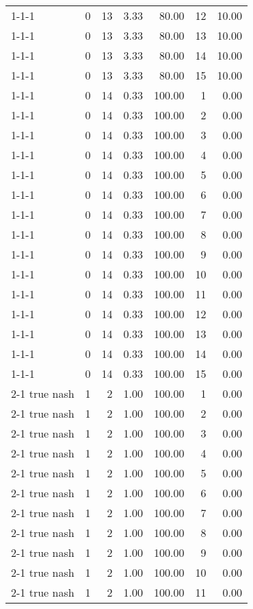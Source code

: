 \begin{tabular}{lrrrrrr}
1-1-1 & 0 & 13 & 3.33 & 80.00 & 12 & 10.00 \\
1-1-1 & 0 & 13 & 3.33 & 80.00 & 13 & 10.00 \\
1-1-1 & 0 & 13 & 3.33 & 80.00 & 14 & 10.00 \\
1-1-1 & 0 & 13 & 3.33 & 80.00 & 15 & 10.00 \\
1-1-1 & 0 & 14 & 0.33 & 100.00 & 1 & 0.00 \\
1-1-1 & 0 & 14 & 0.33 & 100.00 & 2 & 0.00 \\
1-1-1 & 0 & 14 & 0.33 & 100.00 & 3 & 0.00 \\
1-1-1 & 0 & 14 & 0.33 & 100.00 & 4 & 0.00 \\
1-1-1 & 0 & 14 & 0.33 & 100.00 & 5 & 0.00 \\
1-1-1 & 0 & 14 & 0.33 & 100.00 & 6 & 0.00 \\
1-1-1 & 0 & 14 & 0.33 & 100.00 & 7 & 0.00 \\
1-1-1 & 0 & 14 & 0.33 & 100.00 & 8 & 0.00 \\
1-1-1 & 0 & 14 & 0.33 & 100.00 & 9 & 0.00 \\
1-1-1 & 0 & 14 & 0.33 & 100.00 & 10 & 0.00 \\
1-1-1 & 0 & 14 & 0.33 & 100.00 & 11 & 0.00 \\
1-1-1 & 0 & 14 & 0.33 & 100.00 & 12 & 0.00 \\
1-1-1 & 0 & 14 & 0.33 & 100.00 & 13 & 0.00 \\
1-1-1 & 0 & 14 & 0.33 & 100.00 & 14 & 0.00 \\
1-1-1 & 0 & 14 & 0.33 & 100.00 & 15 & 0.00 \\
2-1  true nash & 1 & 2 & 1.00 & 100.00 & 1 & 0.00 \\
2-1  true nash & 1 & 2 & 1.00 & 100.00 & 2 & 0.00 \\
2-1  true nash & 1 & 2 & 1.00 & 100.00 & 3 & 0.00 \\
2-1  true nash & 1 & 2 & 1.00 & 100.00 & 4 & 0.00 \\
2-1  true nash & 1 & 2 & 1.00 & 100.00 & 5 & 0.00 \\
2-1  true nash & 1 & 2 & 1.00 & 100.00 & 6 & 0.00 \\
2-1  true nash & 1 & 2 & 1.00 & 100.00 & 7 & 0.00 \\
2-1  true nash & 1 & 2 & 1.00 & 100.00 & 8 & 0.00 \\
2-1  true nash & 1 & 2 & 1.00 & 100.00 & 9 & 0.00 \\
2-1  true nash & 1 & 2 & 1.00 & 100.00 & 10 & 0.00 \\
2-1  true nash & 1 & 2 & 1.00 & 100.00 & 11 & 0.00 \\

\end{tabular}

